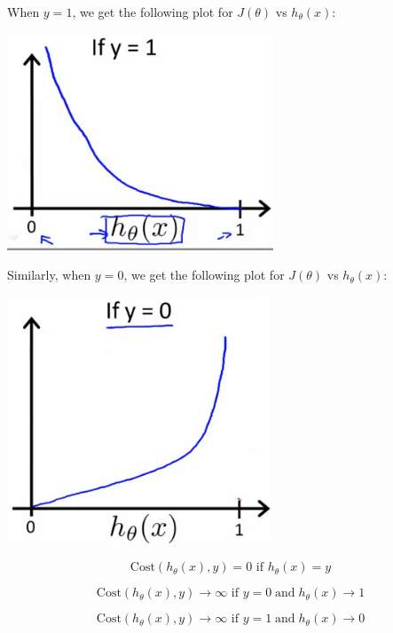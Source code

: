 \documentclass[UTF8]{article}
\begin{document}
When $y = 1$, we get the following plot for $J(\theta)$ vs $h_\theta(x)$:

\includegraphics[width = .8\textwidth]{NotePics/6_4_1.png}

Similarly, when $y = 0$, we get the following plot for $J(\theta)$ vs $h_\theta(x)$:

\includegraphics[width = .8\textwidth]{NotePics/6_4_2.png}

\[ \mathrm{Cost}(h_\theta(x),y) = 0 \text{ if } h_\theta(x) = y \]

\[ \mathrm{Cost}(h_\theta(x),y) \rightarrow \infty \text{ if } y = 0 \; \mathrm{and} \; h_\theta(x) \rightarrow 1 \]

\[ \mathrm{Cost}(h_\theta(x),y) \rightarrow \infty \text{ if } y = 1 \; \mathrm{and} \; h_\theta(x) \rightarrow 0 \]
\end{document}
